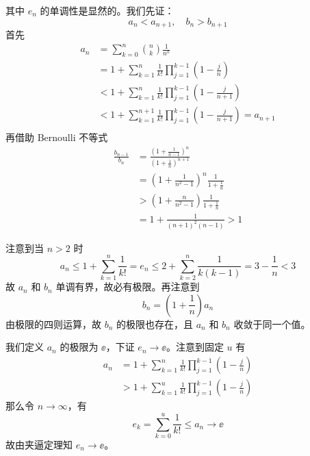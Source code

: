 其中 $e_n$ 的单调性是显然的。我们先证：
\[ a_n < a_{n+1},\quad b_n > b_{n+1} \]
首先
\[ \begin{aligned}
		a_n & = \sum_{k=0}^{n} \binom{n}{k} \frac{1}{n^k}                                                    \\
		    & = 1 + \sum_{k=1}^n \frac{1}{k!} \prod_{j=1}^{k-1} \left(1 - \frac{j}{n}\right)                 \\
		    & < 1 + \sum_{k=1}^n \frac{1}{k!} \prod_{j=1}^{k-1} \left(1 - \frac{j}{n+1}\right)               \\
		    & < 1 + \sum_{k=1}^{n+1} \frac{1}{k!} \prod_{j=1}^{k-1} \left(1 - \frac{j}{n+1}\right) = a_{n+1} \\
	\end{aligned} \]
再借助 Bernoulli 不等式
\[ \begin{aligned}
		\frac{b_{n-1}}{b_n} & = \frac{\left(1 + \frac{1}{n-1}\right)^n}{\left(1 + \frac{1}{n}\right)^{n+1}} \\
		                    & = \left(1+\frac{1}{n^2 - 1}\right)^n \frac{1}{1 + \frac{1}{n}}                \\
		                    & > \left(1+\frac{n}{n^2 - 1}\right) \frac{1}{1 + \frac{1}{n}}                  \\
		                    & = 1 + \frac{1}{(n+1)^2(n-1)} > 1
	\end{aligned} \]

注意到当 $n > 2$ 时
\[ a_n \leqslant 1 + \sum_{k=1}^n \frac{1}{k!} = e_n \leqslant 2 + \sum_{k=2}^n \frac{1}{k(k-1)} = 3 - \frac{1}{n} < 3 \]
故 $a_n$ 和 $b_n$ 单调有界，故必有极限。再注意到
\[ b_n = \left(1 + \frac{1}{n}\right) a_n \]
由极限的四则运算，故 $b_n$ 的极限也存在，且 $a_n$ 和 $b_n$ 收敛于同一个值。

我们定义 $a_n$ 的极限为 $\ee$，下证 $e_n \to \ee$。注意到固定 $u$ 有
\[ \begin{aligned}
		a_n & = 1 + \sum_{k=1}^n \frac{1}{k!} \prod_{j=1}^{k-1} \left(1 - \frac{j}{n}\right) \\
		    & > 1 + \sum_{k=1}^u \frac{1}{k!} \prod_{j=1}^{k-1} \left(1 - \frac{j}{n}\right)
	\end{aligned} \]
那么令 $n \to \infty$，有
\[ e_k = \sum_{k=0}^u \frac{1}{k!}\leqslant a_n \to \ee \]
故由夹逼定理知 $e_n \to \ee$。

